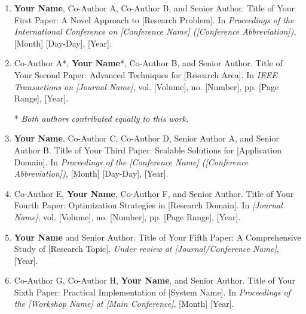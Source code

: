 \begin{publications}
\begin{enumerate}

\item \textbf{Your Name}, Co-Author A, Co-Author B, and Senior Author. Title of Your First Paper: A Novel Approach to [Research Problem]. In \textit{Proceedings of the International Conference on [Conference Name] ([Conference Abbreviation])}, [Month] [Day-Day], [Year].

\item Co-Author A*, \textbf{Your Name}*, Co-Author B, and Senior Author. Title of Your Second Paper: Advanced Techniques for [Research Area]. In \textit{IEEE Transactions on [Journal Name]}, vol. [Volume], no. [Number], pp. [Page Range], [Year].

* \textit{Both authors contributed equally to this work.}

\item \textbf{Your Name}, Co-Author C, Co-Author D, Senior Author A, and Senior Author B. Title of Your Third Paper: Scalable Solutions for [Application Domain]. In \textit{Proceedings of the [Conference Name] ([Conference Abbreviation])}, [Month] [Day-Day], [Year].

\item Co-Author E, \textbf{Your Name}, Co-Author F, and Senior Author. Title of Your Fourth Paper: Optimization Strategies in [Research Domain]. In \textit{[Journal Name]}, vol. [Volume], no. [Number], pp. [Page Range], [Year].

\item \textbf{Your Name} and Senior Author. Title of Your Fifth Paper: A Comprehensive Study of [Research Topic]. \textit{Under review at [Journal/Conference Name]}, [Year].

\item Co-Author G, Co-Author H, \textbf{Your Name}, and Senior Author. Title of Your Sixth Paper: Practical Implementation of [System Name]. In \textit{Proceedings of the [Workshop Name] at [Main Conference]}, [Month] [Year].

\end{enumerate}

\end{publications}